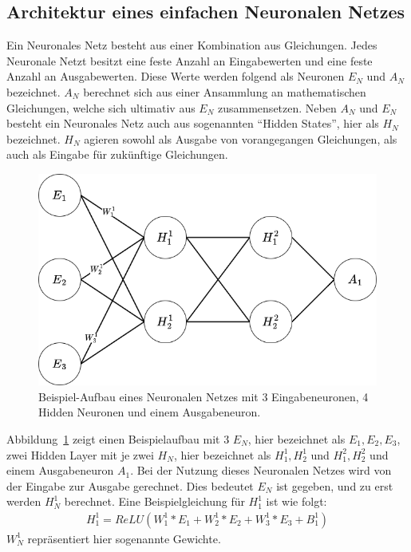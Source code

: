 \subsection{Architektur eines einfachen Neuronalen Netzes}
Ein Neuronales Netz besteht aus einer Kombination aus Gleichungen.
Jedes Neuronale Netzt besitzt eine feste Anzahl an Eingabewerten und eine feste Anzahl an Ausgabewerten.
Diese Werte werden folgend als Neuronen $E_N$ und $A_N$ bezeichnet.
$A_N$ berechnet sich aus einer Ansammlung an mathematischen Gleichungen, welche sich ultimativ aus  $E_N$ zusammensetzen.
Neben $A_N$ und $E_N$ besteht ein Neuronales Netz auch aus sogenannten \enquote{Hidden States}, hier als $H_N$ bezeichnet.
$H_N$ agieren sowohl als Ausgabe von vorangegangen Gleichungen, als auch als Eingabe für zukünftige Gleichungen.\\
\begin{figure}
    \centering
    \includegraphics[width=\textwidth]{zeichnungen/nn.png}
    \caption{Beispiel-Aufbau eines Neuronalen Netzes mit 3 Eingabeneuronen, 4 Hidden Neuronen und einem Ausgabeneuron.}\label{nn_simple}
\end{figure}
Abbildung~\ref{nn_simple} zeigt einen Beispielaufbau mit 3 $E_N$, hier bezeichnet als $E_1,E_2,E_3$, zwei Hidden Layer mit je zwei $H_N$, hier bezeichnet als $H^1_1, H^1_2$ und $H^2_1, H^2_2$ und einem Ausgabeneuron $A_1$.
Bei der Nutzung dieses Neuronalen Netzes wird von der Eingabe zur Ausgabe gerechnet.
Dies bedeutet $E_N$ ist gegeben, und zu erst werden $H^1_N$ berechnet.
Eine Beispielgleichung für $H^1_1$ ist wie folgt:
\begin{align}
    H^1_1=ReLU(W^1_1*E_1 + W^1_2*E_2 + W^1_3*E_3 + B^1_1)
\end{align}
$W^1_N$ repräsentiert hier sogenannte Gewichte.
